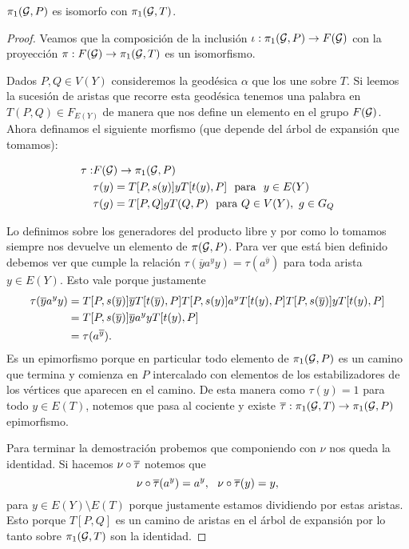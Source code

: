 \documentclass[tesis.tex]{subfiles}
\newcommand{\cG}{ {\cal G} }
\begin{document}
\begin{teo}
	$\pi_1({\cal G}, P)$ es isomorfo con $\pi_1({\cal G}, T)$.
\end{teo}
\begin{proof}
	Veamos que la composición de la inclusión $\iota: \pi_1( \cG ,P)  \to F(\cG)$ con la proyección $\pi: F(\cG) \to \pi_1(\cG, T)$ es un isomorfismo.
	
	Dados $P,Q \in V(Y)$ consideremos la geodésica $\alpha$ que los une sobre $T$.
	Si leemos la sucesión de aristas que recorre esta geodésica tenemos una palabra en $T(P,Q) \in F_{E(Y)}$ de manera que nos define un elemento en el grupo $F(\cG)$.
	Ahora definamos el siguiente morfismo (que depende del árbol de expansión que tomamos):
	
	\begin{align*}
		\tau: & F(\cG) \to \pi_1(\cG,P)  \\
		& \tau(y) = T[P,s(y)]yT[t(y),P] \ \ \text{para } \ y\in E(Y) \\
		& \tau(g) = T[P,Q] g T(Q,P) \ \  \text{para} \ Q \in V(Y), \ g \in G_Q
	\end{align*}
	
	Lo definimos sobre los generadores del producto libre y por como lo tomamos siempre nos devuelve un elemento de $\pi(\cG, P)$.
	Para ver que está bien definido debemos ver que cumple la relación $\tau(\overline y a^y y) = \tau (a^{\overline y})$ para toda arista $y \in E(Y)$.
	Esto vale porque justamente 
	\begin{align*}
		\tau(\overline y a^y y) & = T[P,s(\overline y)]\overline yT[t(\overline y),P] T[P,s(y)] a^y T[t(y),P] T[P,s(\overline y)]yT[t( y),P] \\
		& = T[P,s(\overline y)]  \overline y a^y y T[t( y),P] \\
		& = \tau (a^{\overline y}).
	\end{align*}
	Es un epimorfismo porque en particular todo elemento de $\pi_1(\cG, P)$ es un camino que termina y comienza en $P$ intercalado con elementos de los estabilizadores de los vértices que aparecen en el camino.
	De esta manera como $\tau(y)=1$ para todo $y \in E(T)$, notemos que pasa al cociente y existe $\ol \tau: \pi_{1}(\cG, T) \to \pi_1 (\cG, P)$ epimorfismo.
	
	Para terminar la demostración probemos que componiendo con $\nu$ nos queda la identidad.
	Si hacemos $\nu \circ \overline \tau$ notemos que 
	\begin{equation*}
		\nu \circ \overline \tau (a^y) = a^y, \ \ \nu \circ \overline \tau (y) = y, 
	\end{equation*}
	para $y \in E(Y) \setminus E(T)$ porque justamente estamos dividiendo por estas aristas. 
	Esto porque $T[P,Q]$ es un camino de aristas en el árbol de expansión por lo tanto sobre $\pi_1(\cG, T)$ son la identidad.
\end{proof}
\end{document}
